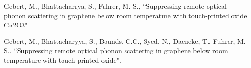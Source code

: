\documentclass[10pt,a4paper,ragged2e,withhyper]{altacv}
\begin{document}
\begin{paracol}{2}
         	    		
        \nocite{*} %
        \vspace{-0.6em}
        
        \printbibliography[type=article,heading=none]
        
        \vspace{-1em}
        \divider
        
        
        \vspace{-0.6em}
        \printbibliography[type=unpublished,heading=none]
        
        
        
        
        
        
        
        
        
        
        Gebert, M., Bhattacharrya, S., Fuhrer, M. S., ``Suppressing remote optical phonon scattering in graphene below room temperature with touch-printed oxide Ga2O3".
        
        \divider
        
        Gebert, M., Bhattacharyya, S., Bounds, C.C., Syed, N., Daeneke, T., Fuhrer, M. S.,
        ``Suppressing remote optical phonon scattering in graphene below room temperature with touch‐printed oxide".
        

\end{paracol}
\end{document}

